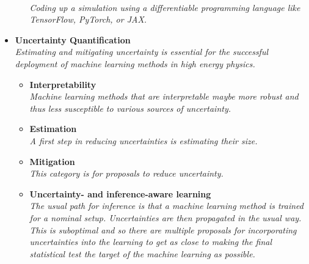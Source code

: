 \documentclass[12pt,letterpaper]{article}
\begin{document}
\begin{itemize}
\begin{itemize}
		\\\textit{Coding up a simulation using a differentiable programming language like TensorFlow, PyTorch, or JAX.}
	\end{itemize}
\item \textbf{Uncertainty Quantification}
\\\textit{Estimating and mitigating uncertainty is essential for the successful deployment of machine learning methods in high energy physics. }
	\begin{itemize}
		\item \textbf{Interpretability}~\cite{Vent:2025ddm,Erdmann:2025xpm,Chung:2025zib,Larkoski:2025clo,Kriesten:2024are,Gavrikov:2024rso,Wilkinson:2024xva,Ngairangbam:2023cps,Mengel:2023mnw,Barman:2023hbs,Roy:2022gge,Khot:2022aky,Grojean:2022mef,Anzalone:2022hrt,Bradshaw:2022qev,Mokhtar:2021bkf,Collins:2021pld,Romero:2021qlf,Grojean:2020ech,Agarwal:2020fpt,Diefenbacher:2019ezd,Chang:2017kvc,deOliveira:2015xxd}
		\\\textit{Machine learning methods that are interpretable maybe more robust and thus less susceptible to various sources of uncertainty.}
		\item \textbf{Estimation}~\cite{Benevedes:2025nzr,Desai:2025mpy,Elsharkawy:2025yeb,Khot:2025kqg,Kriesten:2024ist,Panahi:2024sfb,Bieringer:2024nbc,Dickinson:2023yes,Golutvin:2023fle,Koh:2023wst,Cheung:2022dil,Bellagente:2021yyh,Barnard:2016qma,Nachman:2019yfl,Nachman:2019dol}
		\\\textit{A first step in reducing uncertainties is estimating their size.}
		\item \textbf{Mitigation}~\cite{Azakli:2025yfb,Stein:2022nvf,Araz:2021wqm,Louppe:2016ylz,Englert:2018cfo,Estrade:DLPS2017}
		\\\textit{This category is for proposals to reduce uncertainty.}
		\item \textbf{Uncertainty- and inference-aware learning}~\cite{Grossi:2025pmm,Frohnert:2025usi,Elsharkawy:2025six,Benato:2025rgo,CMS:2025cwy,Grosso:2025kmt,Layer:2023lwi,Simpson:2022suz,Abudinen:2021qpc,Ghosh:2021roe,Wunsch:2020iuh,deCastro:2018mgh,Bollweg:2019skg,Caron:2019xkx,DAgnolo:2018cun}
		\\\textit{The usual path for inference is that a machine learning method is trained for a nominal setup.  Uncertainties are then propagated in the usual way.  This is suboptimal and so there  are multiple proposals for incorporating uncertainties into the learning to get as close to making the final statistical test the target of the machine learning as possible.}

\end{itemize}
\end{itemize}
\end{document}
